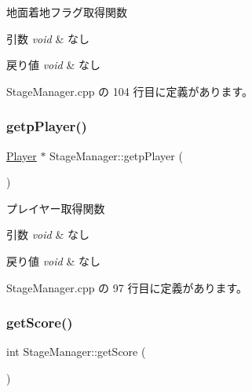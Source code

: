 地面着地フラグ取得関数 


\begin{DoxyParams}{引数}
{\em void} & なし \\
\hline
\end{DoxyParams}

\begin{DoxyRetVals}{戻り値}
{\em void} & なし \\
\hline
\end{DoxyRetVals}


 Stage\+Manager.\+cpp の 104 行目に定義があります。

\mbox{\label{class_stage_manager_af778714de131c8b559c2860647a342a1}} 
\subsubsection{\texorpdfstring{getp\+Player()}{getpPlayer()}}
{\footnotesize\ttfamily \mbox{\hyperlink{class_player}{Player}} $\ast$ Stage\+Manager\+::getp\+Player (\begin{DoxyParamCaption}{ }\end{DoxyParamCaption})}



プレイヤー取得関数 


\begin{DoxyParams}{引数}
{\em void} & なし \\
\hline
\end{DoxyParams}

\begin{DoxyRetVals}{戻り値}
{\em void} & なし \\
\hline
\end{DoxyRetVals}


 Stage\+Manager.\+cpp の 97 行目に定義があります。

\mbox{\label{class_stage_manager_ae54498baebd27e0b48c7bcfbe6555b34}} 
\subsubsection{\texorpdfstring{get\+Score()}{getScore()}}
{\footnotesize\ttfamily int Stage\+Manager\+::get\+Score (\begin{DoxyParamCaption}{ }\end{DoxyParamCaption})}



